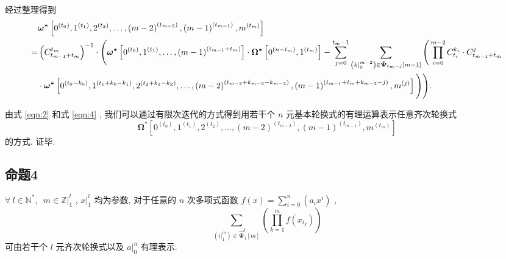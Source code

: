 \documentclass{article}
\renewcommand\.{.\hspace{3pt}}
\renewcommand\,{,\hspace{4pt}}
\renewcommand\:{:\hspace{3pt}}
\newcommand\A{,\hspace{6pt}}
\begin{document}
	经过整理得到
	\begin{align} \label{eqn:4}
		& \bm{\omega^{\ast}} \left[ 0^{\left( t_{0} \right)} , 1^{\left( t_{1} \right)} , 2^{\left( t_{2} \right)} , \ldots , \left( m-2 \right)^{\left( t_{m-2} \right)} , \left( m-1 \right)^{\left( t_{m-1} \right)} , m^{\left( t_{m} \right)} \right] \notag \\
		= & \left( C_{t_{m-1} + t_{m}}^{t_{m}} \right)^{-1} \cdot \Bigg( \bm{\omega^{\ast}} \left[ 0^{\left( t_{0} \right)} , 1^{\left( t_{1} \right)} , \ldots , \left( m-1 \right)^{\left( t_{m-1} + t_{m} \right)} \right] \cdot \bm{\Omega^{\ast}} \left[ 0^{\left( n-t_{m} \right)} , 1^{\left( t_{m} \right)} \right] - \sum_{j=0}^{t_{m}-1} \sum_{\left( k |_{0}^{m-2} \right) \in \bm{\hat{\Psi}}_{t_{m}-j} \left[ m-1 \right]} \Bigg( \prod_{i=0}^{m-2} C_{t_{i}}^{k_{i}} \cdot C_{t_{m-1} + t_{m}}^{j} \Bigg. \Bigg. \notag \\
		& \Bigg. \Bigg. \cdot \bm{\omega^{\ast}} \left[ 0^{\left( t_{0} - k_{0} \right)} , 1^{\left( t_{1} + k_{0} - k_{1} \right)} , 2^{\left( t_{2} + k_{1} - k_{2} \right)} , \ldots , \left( m-2 \right)^{\left( t_{m-2} + k_{m-3} - k_{m-2} \right)} , \left( m-1 \right)^{\left( t_{m-1} + t_{m} + k_{m-2} - j \right)} , m^{\left( j \right)} \right] \Bigg) \Bigg) \.
	\end{align}
	
	由式 \eqref{eqn:2} 和式 \eqref{eqn:4} \, 我们可以通过有限次迭代的方式得到用若干个 $n$ 元基本轮换式的有理运算表示任意齐次轮换式 $$\bm{\Omega^{\ast}} \left[ 0^{\left( t_{0} \right)} , 1^{\left( t_{1} \right)} , 2^{\left( t_{2} \right)} , \ldots , \left( m-2 \right)^{\left( t_{m-2} \right)} , \left( m-1 \right)^{\left( t_{m-1} \right)} , m^{\left( t_{m} \right)} \right]$$ 的方式\. 证毕\.
	
	\subsection{命题4} \label{sec:3.5}
	$\forall \ l \in \mathbb{N^{\ast}} \A m \in \mathbb{Z} |_{1}^{l}$ \, $x |_{1}^{l}$ 均为参数\, 对于任意的 $n$ 次多项式函数 $f(x) = \sum_{i=0}^{n} \left( a_{i} x^{i} \right)$ \, $$\sum_{\left( i |_{1}^{m} \right) \in \bm{\vec{\Psi}}_{1}^{l} \left[ m \right]} \left( \prod_{k=1}^{m} f \left( x_{i_{k}} \right) \right)$$ 可由若干个 $l$ 元齐次轮换式以及 $a |_{0}^{n}$ 有理表示\.
	
\end{document}
